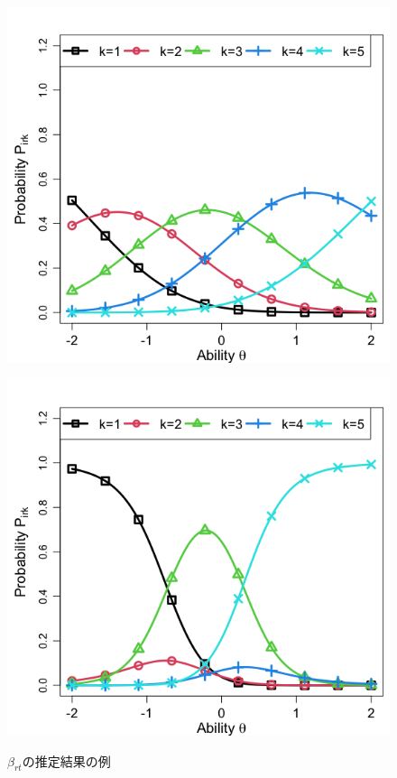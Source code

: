 \documentclass[a4paper,11pt,oneside,openany]{jsbook}
\begin{document}
\begin{figure}[]
\centering
 \begin{minipage}[b]{0.4\linewidth}
  \centering
  \includegraphics[keepaspectratio,scale=0.25]{img/ICC_r14.png}
  \label{D}
 \end{minipage}
 \begin{minipage}[b]{0.4\linewidth}
  \centering
  \includegraphics[keepaspectratio,scale=0.25]{img/ICC_r15.png}
  \label{E}
 \end{minipage}
 \caption{$\beta_{rt}$の推定結果の例}\label{beta_rt_data}
\end{figure}
\end{document}
